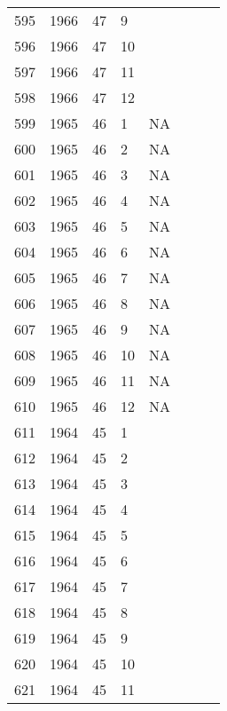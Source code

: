 \begin{longtable}{ |l|l|l|l|l|l|l|l| }
595 & 1966 & 47 &     9 &         &                &  & \\
596 & 1966 & 47 &    10 &         &                &  & \\
597 & 1966 & 47 &    11 &         &                &  & \\
598 & 1966 & 47 &    12 &         &                &  & \\
599 & 1965 & 46 &     1 &      NA &                &  & \\
600 & 1965 & 46 &     2 &      NA &                &  & \\
601 & 1965 & 46 &     3 &      NA &                &  & \\
602 & 1965 & 46 &     4 &      NA &                &  & \\
603 & 1965 & 46 &     5 &      NA &                &  & \\
604 & 1965 & 46 &     6 &      NA &                &  & \\
605 & 1965 & 46 &     7 &      NA &                &  & \\
606 & 1965 & 46 &     8 &      NA &                &  & \\
607 & 1965 & 46 &     9 &      NA &                &  & \\
608 & 1965 & 46 &    10 &      NA &                &  & \\
609 & 1965 & 46 &    11 &      NA &                &  & \\
610 & 1965 & 46 &    12 &      NA &                &  & \\
611 & 1964 & 45 &     1 &         &                &  & \\
612 & 1964 & 45 &     2 &         &                &  & \\
613 & 1964 & 45 &     3 &         &                &  & \\
614 & 1964 & 45 &     4 &         &                &  & \\
615 & 1964 & 45 &     5 &         &                &  & \\
616 & 1964 & 45 &     6 &         &                &  & \\
617 & 1964 & 45 &     7 &         &                &  & \\
618 & 1964 & 45 &     8 &         &                &  & \\
619 & 1964 & 45 &     9 &         &                &  & \\
620 & 1964 & 45 &    10 &         &                &   & \\
621 & 1964 & 45 &    11 &         &                &  & \\

\end{longtable}
